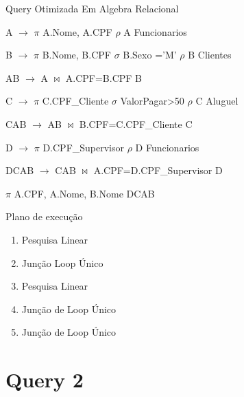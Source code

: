 \documentclass[aspectratio=169]{beamer}
\begin{document}
  \begin{frame}{Query Otimizada}
    Em Algebra Relacional
    \begin{flushleft}
     A $\rightarrow$ $\pi$ A.Nome, A.CPF $\rho$ A Funcionarios 

     B $\rightarrow$ $\pi$ B.Nome, B.CPF $\sigma$ B.Sexo ='M' $\rho$ B Clientes

     AB $\rightarrow$ A $\bowtie$ A.CPF=B.CPF B

     C $\rightarrow$ $\pi$ C.CPF\_Cliente $\sigma$ ValorPagar>50 $\rho$ C Aluguel

     CAB $\rightarrow$ AB $\bowtie$ B.CPF=C.CPF\_Cliente C

     D $\rightarrow$ $\pi$ D.CPF\_Supervisor $\rho$ D Funcionarios 

     DCAB $\rightarrow$ CAB $\bowtie$ A.CPF=D.CPF\_Supervisor D

     $\pi$ A.CPF, A.Nome, B.Nome DCAB
    \end{flushleft}
  \end{frame}
  \begin{frame}{Plano de execução}
    
    \begin{enumerate}
      \item Pesquisa Linear
      \item Junção Loop Único
      \item Pesquisa Linear 
      \item Junção de Loop Único 
      \item Junção de Loop Único 
    \end{enumerate}
  \end{frame}

  \section{Query 2}
\end{document}
